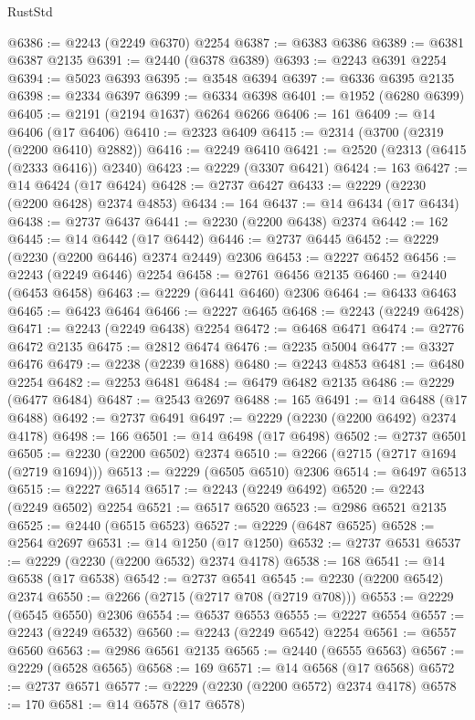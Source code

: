 \begin{lexlean}{RustStd}
\begin{coremodule}
{\begin{coremodule}
{{{{{{{{{{{{{{{{{{{{{{{{{{{{{{{{{{@6386 := @2243 (@2249 @6370) @2254
@6387 := @6383 @6386
@6389 := @6381 @6387 @2135
@6391 := @2440 (@6378 @6389)
@6393 := @2243 @6391 @2254
@6394 := @5023 @6393
@6395 := @3548 @6394
@6397 := @6336 @6395 @2135
@6398 := @2334 @6397
@6399 := @6334 @6398
@6401 := @1952 (@6280 @6399)
@6405 := @2191 (@2194 @1637) @6264 @6266
@6406 := 161
@6409 := @14 @6406 (@17 @6406)
@6410 := @2323 @6409
@6415 := @2314 (@3700 (@2319 (@2200 @6410) @2882))
@6416 := @2249 @6410
@6421 := @2520 (@2313 (@6415 (@2333 @6416)) @2340)
@6423 := @2229 (@3307 @6421)
@6424 := 163
@6427 := @14 @6424 (@17 @6424)
@6428 := @2737 @6427
@6433 := @2229 (@2230 (@2200 @6428) @2374 @4853)
@6434 := 164
@6437 := @14 @6434 (@17 @6434)
@6438 := @2737 @6437
@6441 := @2230 (@2200 @6438) @2374
@6442 := 162
@6445 := @14 @6442 (@17 @6442)
@6446 := @2737 @6445
@6452 := @2229 (@2230 (@2200 @6446) @2374 @2449) @2306
@6453 := @2227 @6452
@6456 := @2243 (@2249 @6446) @2254
@6458 := @2761 @6456 @2135
@6460 := @2440 (@6453 @6458)
@6463 := @2229 (@6441 @6460) @2306
@6464 := @6433 @6463
@6465 := @6423 @6464
@6466 := @2227 @6465
@6468 := @2243 (@2249 @6428)
@6471 := @2243 (@2249 @6438) @2254
@6472 := @6468 @6471
@6474 := @2776 @6472 @2135
@6475 := @2812 @6474
@6476 := @2235 @5004
@6477 := @3327 @6476
@6479 := @2238 (@2239 @1688)
@6480 := @2243 @4853
@6481 := @6480 @2254
@6482 := @2253 @6481
@6484 := @6479 @6482 @2135
@6486 := @2229 (@6477 @6484)
@6487 := @2543 @2697
@6488 := 165
@6491 := @14 @6488 (@17 @6488)
@6492 := @2737 @6491
@6497 := @2229 (@2230 (@2200 @6492) @2374 @4178)
@6498 := 166
@6501 := @14 @6498 (@17 @6498)
@6502 := @2737 @6501
@6505 := @2230 (@2200 @6502) @2374
@6510 := @2266 (@2715 (@2717 @1694 (@2719 @1694)))
@6513 := @2229 (@6505 @6510) @2306
@6514 := @6497 @6513
@6515 := @2227 @6514
@6517 := @2243 (@2249 @6492)
@6520 := @2243 (@2249 @6502) @2254
@6521 := @6517 @6520
@6523 := @2986 @6521 @2135
@6525 := @2440 (@6515 @6523)
@6527 := @2229 (@6487 @6525)
@6528 := @2564 @2697
@6531 := @14 @1250 (@17 @1250)
@6532 := @2737 @6531
@6537 := @2229 (@2230 (@2200 @6532) @2374 @4178)
@6538 := 168
@6541 := @14 @6538 (@17 @6538)
@6542 := @2737 @6541
@6545 := @2230 (@2200 @6542) @2374
@6550 := @2266 (@2715 (@2717 @708 (@2719 @708)))
@6553 := @2229 (@6545 @6550) @2306
@6554 := @6537 @6553
@6555 := @2227 @6554
@6557 := @2243 (@2249 @6532)
@6560 := @2243 (@2249 @6542) @2254
@6561 := @6557 @6560
@6563 := @2986 @6561 @2135
@6565 := @2440 (@6555 @6563)
@6567 := @2229 (@6528 @6565)
@6568 := 169
@6571 := @14 @6568 (@17 @6568)
@6572 := @2737 @6571
@6577 := @2229 (@2230 (@2200 @6572) @2374 @4178)
@6578 := 170
@6581 := @14 @6578 (@17 @6578)
}}}}}}}}}}}}}}}}}}}}}}}}}}}}}}}}}}
\end{coremodule}}
\end{coremodule}
\end{lexlean}
